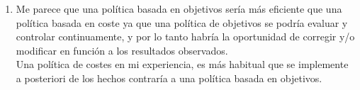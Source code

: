 \begin{enumerate}
    \item Me parece que una política basada en objetivos sería más eficiente que una política basada en coste ya que una política de objetivos se podría evaluar y controlar continuamente, y por lo tanto habría la oportunidad de corregir y/o modificar en función a los resultados observados.\\
    Una política de costes en mi experiencia, es más habitual que se implemente a posteriori de los hechos contraría a una política basada en objetivos.\\\\  

\end{enumerate}
